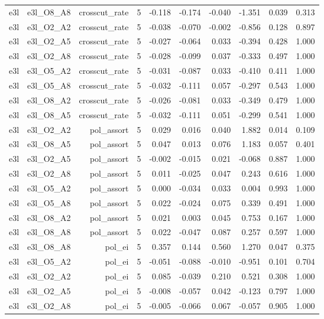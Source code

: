 \documentclass[11pt]{article}
\begin{document}
\begin{landscape}
\begin{longtable}{@{}lrrrrrrrrr@{}}
e3l & e3l\_O8\_A8 & crosscut\_rate & 5 & -0.118 & -0.174 & -0.040 & -1.351 & 0.039 & 0.313 \\
e3l & e3l\_O2\_A2 & crosscut\_rate & 5 & -0.038 & -0.070 & -0.002 & -0.856 & 0.128 & 0.897 \\
e3l & e3l\_O2\_A5 & crosscut\_rate & 5 & -0.027 & -0.064 & 0.033 & -0.394 & 0.428 & 1.000 \\
e3l & e3l\_O2\_A8 & crosscut\_rate & 5 & -0.028 & -0.099 & 0.037 & -0.333 & 0.497 & 1.000 \\
e3l & e3l\_O5\_A2 & crosscut\_rate & 5 & -0.031 & -0.087 & 0.033 & -0.410 & 0.411 & 1.000 \\
e3l & e3l\_O5\_A8 & crosscut\_rate & 5 & -0.032 & -0.111 & 0.057 & -0.297 & 0.543 & 1.000 \\
e3l & e3l\_O8\_A2 & crosscut\_rate & 5 & -0.026 & -0.081 & 0.033 & -0.349 & 0.479 & 1.000 \\
e3l & e3l\_O8\_A5 & crosscut\_rate & 5 & -0.032 & -0.111 & 0.051 & -0.299 & 0.541 & 1.000 \\
e3l & e3l\_O2\_A2 & pol\_assort & 5 & 0.029 & 0.016 & 0.040 & 1.882 & 0.014 & 0.109 \\
e3l & e3l\_O8\_A5 & pol\_assort & 5 & 0.047 & 0.013 & 0.076 & 1.183 & 0.057 & 0.401 \\
e3l & e3l\_O2\_A5 & pol\_assort & 5 & -0.002 & -0.015 & 0.021 & -0.068 & 0.887 & 1.000 \\
e3l & e3l\_O2\_A8 & pol\_assort & 5 & 0.011 & -0.025 & 0.047 & 0.243 & 0.616 & 1.000 \\
e3l & e3l\_O5\_A2 & pol\_assort & 5 & 0.000 & -0.034 & 0.033 & 0.004 & 0.993 & 1.000 \\
e3l & e3l\_O5\_A8 & pol\_assort & 5 & 0.022 & -0.024 & 0.075 & 0.339 & 0.491 & 1.000 \\
e3l & e3l\_O8\_A2 & pol\_assort & 5 & 0.021 & 0.003 & 0.045 & 0.753 & 0.167 & 1.000 \\
e3l & e3l\_O8\_A8 & pol\_assort & 5 & 0.022 & -0.047 & 0.087 & 0.257 & 0.597 & 1.000 \\
e3l & e3l\_O8\_A8 & pol\_ei & 5 & 0.357 & 0.144 & 0.560 & 1.270 & 0.047 & 0.375 \\
e3l & e3l\_O5\_A2 & pol\_ei & 5 & -0.051 & -0.088 & -0.010 & -0.951 & 0.101 & 0.704 \\
e3l & e3l\_O2\_A2 & pol\_ei & 5 & 0.085 & -0.039 & 0.210 & 0.521 & 0.308 & 1.000 \\
e3l & e3l\_O2\_A5 & pol\_ei & 5 & -0.008 & -0.057 & 0.042 & -0.123 & 0.797 & 1.000 \\
e3l & e3l\_O2\_A8 & pol\_ei & 5 & -0.005 & -0.066 & 0.067 & -0.057 & 0.905 & 1.000 \\

\end{longtable}
\end{landscape}
\end{document}

